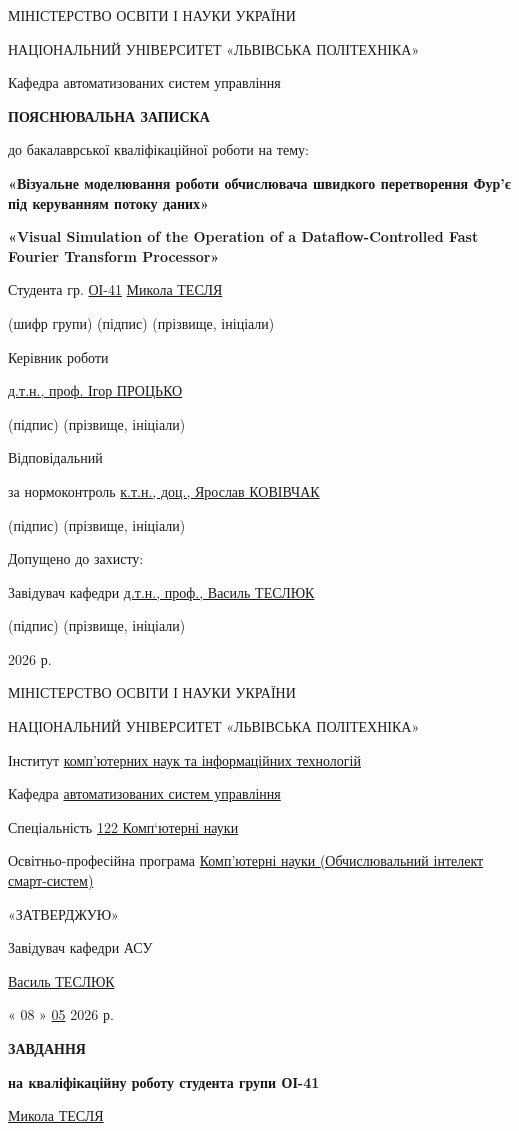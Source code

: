 \documentclass[
]{article}
\author{}
\date{}
\begin{document}
МІНІСТЕРСТВО ОСВІТИ І НАУКИ УКРАЇНИ

НАЦІОНАЛЬНИЙ УНІВЕРСИТЕТ «ЛЬВІВСЬКА ПОЛІТЕХНІКА»

Кафедра автоматизованих систем управління

\textbf{ПОЯСНЮВАЛЬНА ЗАПИСКА}

до бакалаврської кваліфікаційної роботи на тему:

\textbf{«Візуальне моделювання роботи обчислювача швидкого перетворення
Фур'є під керуванням потоку даних»}

\textbf{«Visual Simulation of the Operation of a Dataflow-Controlled
Fast Fourier Transform Processor»}

Студента гр. \ul{ОІ-41} \ul{Микола ТЕСЛЯ}

(шифр групи) (підпис) (прізвище, ініціали)

Керівник роботи

\ul{д.т.н., проф. Ігор ПРОЦЬКО}

(підпис) (прізвище, ініціали)

Відповідальний

за нормоконтроль \ul{к.т.н., доц., Ярослав КОВІВЧАК}

(підпис) (прізвище, ініціали)

Допущено до захисту:

Завідувач кафедри \ul{д.т.н., проф., Василь ТЕСЛЮК}

(підпис) (прізвище, ініціали)

2026 р.

МІНІСТЕРСТВО ОСВІТИ І НАУКИ УКРАЇНИ

НАЦІОНАЛЬНИЙ УНІВЕРСИТЕТ «ЛЬВІВСЬКА ПОЛІТЕХНІКА»

Інститут \ul{комп'ютерних наук та інформаційних технологій}

Кафедра \ul{автоматизованих систем управління}

Спеціальність \ul{122 Комп`ютерні науки}

Освітньо-професійна програма \ul{Комп'ютерні науки (Обчислювальний
інтелект смарт-систем)}

«ЗАТВЕРДЖУЮ»

Завідувач кафедри АСУ

\ul{Василь ТЕСЛЮК}

« 08 » \ul{05} 2026 р.

\textbf{ЗАВДАННЯ}

\textbf{на кваліфікаційну роботу студента групи ОІ-41}

\ul{Микола ТЕСЛЯ}
\end{document}
